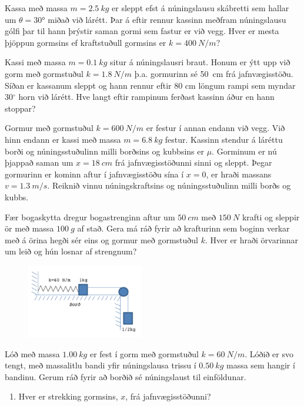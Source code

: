 \begin{enumerate}[label = \textbf{Dæmi \thechapter.\arabic*.}]
\begin{minipage}{\linewidth}
\item Kassa með massa $m = \SI{2.5}{kg}$ er sleppt efst á núningslausu skábretti sem hallar um $\theta = \ang{30}$ miðað við lárétt. Þar á eftir rennur kassinn meðfram núningslausu gólfi þar til hann þrýstir saman gormi sem fastur er við vegg. Hver er mesta þjöppun gormsins ef kraftstuðull gormsins er $k = \SI{400}{N/m}$?

\end{minipage}

\item Kassi með massa $m=\SI{0,1}{kg}$ situr á núningslausri braut. Honum er ýtt upp við gorm með gormstuðul $k=\SI{1,8}{N/m}$ þ.a. gormurinn sé \SI{50}{cm} frá jafnvægisstöðu. Síðan er kassanum sleppt og hann rennur eftir 80 cm löngum rampi sem myndar 30$^{\circ}$ horn við lárétt. Hve langt eftir rampinum ferðast kassinn áður en hann stoppar?

\item Gormur með gormstuðul $k = \SI{600}{N/m}$ er festur í annan endann við vegg. Við hinn endann er kassi með massa $m = \SI{6.8}{kg}$ festur. Kassinn stendur á láréttu borði og núningsstuðulinn milli borðsins og kubbsins er $\mu$. Gorminum er nú þjappað saman um $x = \SI{18}{cm}$ frá jafnvægisstöðunni sinni og sleppt. Þegar gormurinn er kominn aftur í jafnvægisstöðu sína í $x = 0$, er hraði massans $v = \SI{1.3}{m/s}$. Reiknið vinnu núningskraftsins og núningsstuðulinn milli borðs og kubbs.

\item Fær bogaskytta dregur bogastrenginn aftur um $\SI{50}{cm}$ með $\SI{150}{N}$ krafti og sleppir ör með massa $\SI{100}{g}$ af stað. Gera má ráð fyrir að krafturinn sem boginn verkar með á örina hegði sér eins og gormur með gormstuðul $k$. Hver er hraði örvarinnar um leið og hún losnar af strengnum?

\begin{minipage}{\linewidth}
\begin{figure}
\vspace{-0.75cm}
\includegraphics[width = 2in]{temp/burnspring.png}
\end{figure}

\item Lóð með massa $\SI{1.00}{kg}$ er fest í gorm með gormstuðul $k = \SI{60}{N/m}$. Lóðið er svo  tengt, með massalitlu bandi yfir núningslausa trissu í $\SI{0.50}{kg}$ massa sem hangir í bandinu. Gerum ráð fyrir að borðið sé núningslaust til einföldunar.
\begin{enumerate}[label = \textbf{(\alph*)}]
    \item Hver er strekking gormsins, $x$, frá jafnvægisstöðunni?
    

\end{enumerate}
\end{minipage}
\end{enumerate}
